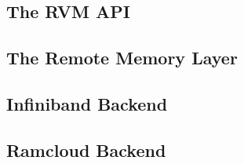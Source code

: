 \subsection{The RVM API}



\subsection{The Remote Memory Layer}



\subsection{Infiniband Backend}



\subsection{Ramcloud Backend}


